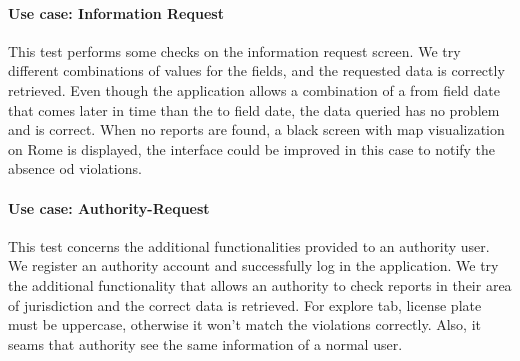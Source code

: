 \paragraph{Use case: Information Request} 
This test performs some checks on the information request screen. We try different combinations of values for the fields, and the requested data is correctly retrieved. Even though the application allows a combination of a from field date that comes later in time than the to field date, the data queried has no problem and is correct. When no reports are found, a black screen with map visualization on Rome is displayed, the interface could be improved in this case to notify the absence od violations.
\paragraph{Use case: Authority-Request}
This test concerns the additional functionalities provided to an authority user. We register an authority account and successfully log in the application. We try the additional functionality that allows an authority to check reports in their area of jurisdiction and the correct data is retrieved. For explore tab, license plate must be uppercase, otherwise it won't match the violations correctly. Also, it seams that authority see the same information of a normal user.